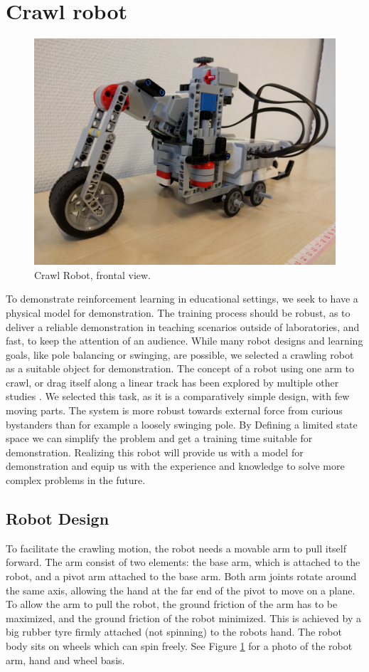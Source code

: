 \documentclass[11pt, a4paper]{article}
\begin{document}
\pagebreak
\section{Crawl robot}
\begin{figure}[H]
	\centering
	\includegraphics[width=0.6\linewidth]{images/crawl_robot}
	\caption{Crawl Robot, frontal view.}
	\label{fig:crawl_robot}
\end{figure}
To demonstrate reinforcement learning in educational settings, we seek to have a physical model for demonstration. The training process should be robust, as to deliver a reliable demonstration in teaching scenarios outside of laboratories, and fast, to keep the attention of an audience. While many robot designs and learning goals, like pole balancing or swinging, are possible, we selected a crawling robot as a suitable object for demonstration. The concept of a robot using one arm to crawl, or drag itself along a linear track has been explored by multiple other studies \cite{youtube_crawl2} \cite{youtube_crawl}. We selected this task, as it is a comparatively simple design, with few moving parts. The system is more robust towards external force from curious bystanders than for example a loosely swinging pole. By Defining a limited state space we can simplify the problem and get a training time suitable for demonstration. Realizing this robot will provide us with a model for demonstration  and equip us with the experience and knowledge to solve more complex problems in the future.


\subsection{Robot Design}
To facilitate the crawling motion, the robot needs a movable arm to pull itself forward. The arm consist of two elements: the base arm, which is attached to the robot, and a pivot arm attached to the base arm. Both arm joints rotate around the same axis, allowing the hand at the far end of the pivot to move on a plane. To allow the arm to pull the robot, the ground friction of the arm has to be maximized, and the ground friction of the robot minimized. This is achieved by a big rubber tyre firmly attached (not spinning) to the robots hand. The robot body sits on wheels which can spin freely. See Figure \ref{fig:crawl_robot} for a photo of the robot arm, hand and wheel basis.
\end{document}
